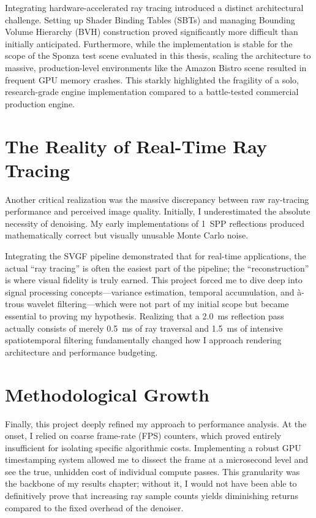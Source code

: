 \documentclass[12pt,a4paper]{report}
\begin{document}
Integrating hardware-accelerated ray tracing introduced a distinct architectural challenge.
Setting up Shader Binding Tables (SBTs) and managing Bounding Volume Hierarchy (BVH) construction proved significantly more difficult than initially anticipated.
Furthermore, while the implementation is stable for the scope of the Sponza test scene evaluated in this thesis, scaling the architecture to massive, production-level environments like the Amazon Bistro scene resulted in frequent GPU memory crashes.
This starkly highlighted the fragility of a solo, research-grade engine implementation compared to a battle-tested commercial production engine.

\section{The Reality of Real-Time Ray Tracing}
Another critical realization was the massive discrepancy between raw ray-tracing performance and perceived image quality. Initially, I underestimated the absolute necessity of denoising.
My early implementations of 1~SPP reflections produced mathematically correct but visually unusable Monte Carlo noise.

Integrating the SVGF pipeline demonstrated that for real-time applications, the actual ``ray tracing'' is often the easiest part of the pipeline; the ``reconstruction'' is where visual fidelity is truly earned.
This project forced me to dive deep into signal processing concepts---variance estimation, temporal accumulation, and \`a-trous wavelet filtering---which were not part of my initial scope but became essential to proving my hypothesis.
Realizing that a 2.0~ms reflection pass actually consists of merely 0.5~ms of ray traversal and 1.5~ms of intensive spatiotemporal filtering fundamentally changed how I approach rendering architecture and performance budgeting.

\section{Methodological Growth}
Finally, this project deeply refined my approach to performance analysis. At the onset, I relied on coarse frame-rate (FPS) counters, which proved entirely insufficient for isolating specific algorithmic costs.
Implementing a robust GPU timestamping system allowed me to dissect the frame at a microsecond level and see the true, unhidden cost of individual compute passes. This granularity was the backbone of my results chapter; without it,
I would not have been able to definitively prove that increasing ray sample counts yields diminishing returns compared to the fixed overhead of the denoiser.
\end{document}
